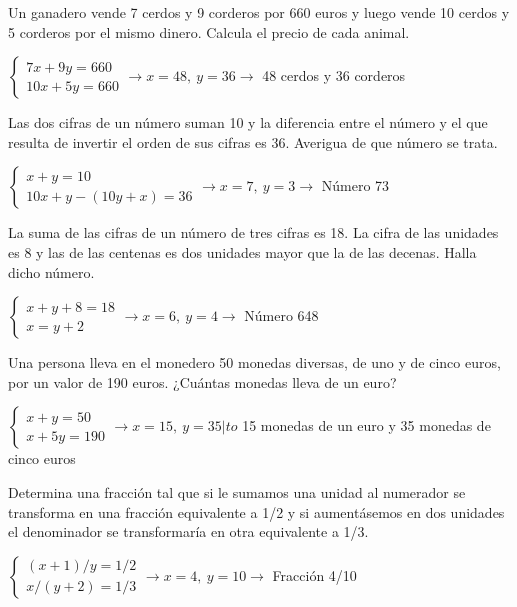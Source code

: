 \documentclass[spanish, 11pt]{exam}
\begin{document}
\begin{questions}
        \question Un ganadero vende 7 cerdos y 9 corderos por 660 euros y luego vende 10 cerdos y 5 corderos por el mismo dinero. Calcula el precio de cada animal.
\begin{solution} $\left\{\begin{matrix}7x+9y=660 \\ 10x+5y=660\end{matrix}\right. \to  x = 48, \  y = 36 \to$ 48 cerdos y 36 corderos \end{solution}

\question Las dos cifras de un número suman 10 y la diferencia entre el número y el que resulta de invertir el orden de sus cifras es 36. Averigua de que número se trata.

\begin{solution}  $\left\{\begin{matrix}x+y=10 \\ 10x+y-(10y+x)=36\end{matrix}\right. \to  x = 7, \  y = 3 \to$ Número 73\end{solution}

\question La suma de las cifras de un número de tres cifras es 18. La cifra de las unidades es 8 y las de las centenas es dos unidades mayor que la de las decenas. Halla dicho número. 
\begin{solution} $\left\{\begin{matrix}x+y+8=18 \\ x=y+2\end{matrix}\right. \to  x = 6, \  y = 4 \to$ Número 648 \end{solution}

\question Una persona lleva en el monedero 50 monedas diversas, de uno y de cinco euros, por un valor de 190 euros. ¿Cuántas monedas lleva de un euro?
\begin{solution} $\left\{\begin{matrix}x+y=50 \\ x+5y=190\end{matrix}\right. \to  x = 15, \  y = 35 |to$ 15 monedas de un euro y 35 monedas de cinco euros \end{solution}

\question Determina una fracción tal que si le sumamos una unidad al numerador se transforma en una fracción equivalente a 1/2 y si aumentásemos en dos unidades el denominador se transformaría en otra equivalente a 1/3.

\begin{solution} $\left\{\begin{matrix}(x+1)/y=1/2 \\ x/(y+2)=1/3\end{matrix}\right. \to  x = 4, \  y = 10 \to$ Fracción 4/10 \end{solution}


\end{questions}
\end{document}
